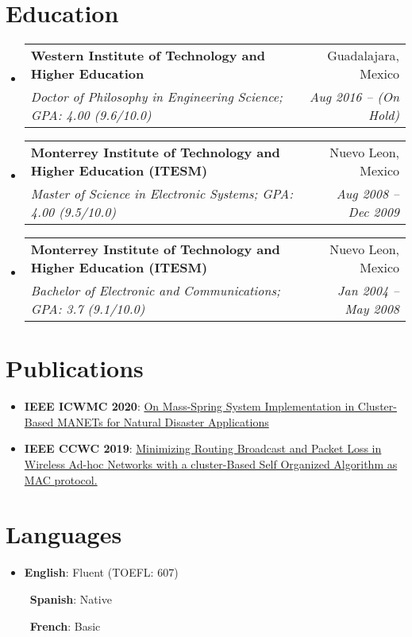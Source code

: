 \documentclass[letterpaper,11pt]{article}
\makeatletter
\newcommand{\resumeItem}[2]{
    \item\small{
        \textbf{#1}{: #2 \vspace{-2pt}}
    }
}
\newcommand{\resumeItemHorizontal}[2]{
    \textbullet\ \textbf{#1}: #2 \hspace{10pt}
}
\newcommand{\resumeSubheading}[4]{
    \vspace{-1pt}\item
    \begin{tabular*}{0.97\textwidth}{l@{\extracolsep{\fill}}r}
        \textbf{#1} & #2 \\
        \textit{\small#3} & \textit{\small #4} \\
    \end{tabular*}\vspace{-5pt}
}
\newcommand{\resumeSubHeadingListStart}{\begin{itemize}[leftmargin=*]}
\newcommand{\resumeSubHeadingListEnd}{\end{itemize}}
\newcommand{\resumeItemListStart}{\begin{itemize}}
\newcommand{\resumeItemListEnd}{\end{itemize}\vspace{-5pt}}
\makeatother
\begin{document}
\section{Education}
\resumeSubHeadingListStart
\resumeSubheading
{Western Institute of Technology and Higher Education}{Guadalajara, Mexico}
{Doctor of Philosophy in Engineering Science; GPA: 4.00 (9.6/10.0)}{Aug 2016 -- (On Hold)}
\resumeSubheading
{Monterrey Institute of Technology and Higher Education (ITESM)}{Nuevo Leon, Mexico}
{Master of Science in Electronic Systems;  GPA: 4.00 (9.5/10.0)}{Aug 2008 -- Dec 2009}
\resumeSubheading
{Monterrey Institute of Technology and Higher Education (ITESM)}{Nuevo Leon, Mexico}
{Bachelor of Electronic and Communications;  GPA: 3.7 (9.1/10.0)}{Jan 2004 -- May 2008}
\resumeSubHeadingListEnd

%
\section{Publications}
\label{sec:Publications}
\resumeSubHeadingListStart
\resumeItem{IEEE ICWMC 2020}{\href{http://www.thinkmind.org/index.php?view=article&articleid=icwmc_2020_1_10_20034}{On Mass-Spring System Implementation in Cluster-Based MANETs for Natural Disaster Applications}}
\resumeItem{IEEE CCWC 2019}{\href{https://ieeexplore.ieee.org/document/8666583}{Minimizing Routing Broadcast and Packet Loss in Wireless Ad-hoc Networks with a cluster-Based Self Organized Algorithm as MAC protocol.}}
\resumeSubHeadingListEnd

%
\section{Languages}
\resumeSubHeadingListStart
\resumeItem{English}{Fluent (TOEFL: 607)}
\resumeItemHorizontal{Spanish}{Native}
\resumeItemHorizontal{French}{Basic}
\resumeSubHeadingListEnd
\end{document}
